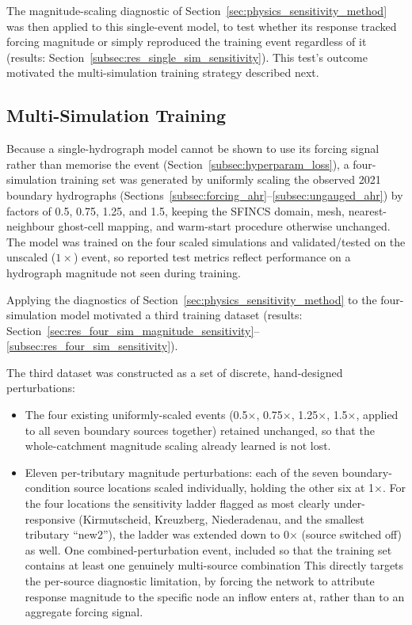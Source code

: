 \documentclass[12pt,a4paper]{report}
\begin{document}
{The magnitude-scaling diagnostic of Section~\ref{sec:physics_sensitivity_method}
was then applied to this single-event model, to test whether its response tracked
forcing magnitude or simply reproduced the training event regardless of it
(results: Section~\ref{subsec:res_single_sim_sensitivity}). This test's outcome
motivated the multi-simulation training strategy described next.

\subsection{Multi-Simulation Training}
\label{subsec:multisimtraining}

Because a single-hydrograph model cannot be shown to use its forcing signal rather than
memorise the event (Section~\ref{subsec:hyperparam_loss}), a four-simulation training
set was generated by uniformly scaling the observed 2021 boundary hydrographs
(Sections~\ref{subsec:forcing_ahr}--\ref{subsec:ungauged_ahr}) by factors of 0.5, 0.75,
1.25, and 1.5, keeping the SFINCS domain, mesh, nearest-neighbour ghost-cell mapping,
and warm-start procedure otherwise unchanged. The model was trained on the four scaled
simulations and validated/tested on the unscaled ($1\times$) event, so reported test
metrics reflect performance on a hydrograph magnitude not seen during training.

Applying the diagnostics of Section~\ref{sec:physics_sensitivity_method} to the four-simulation model motivated a third training dataset (results: Section~\ref{sec:res_four_sim_magnitude_sensitivity}--\ref{subsec:res_four_sim_sensitivity}).

The third dataset was constructed as a set of discrete, hand-designed perturbations:

\begin{itemize}
    \item The four existing uniformly-scaled events (0.5$\times$, 0.75$\times$, 1.25$\times$, 1.5$\times$, applied to all seven boundary sources together) retained unchanged, so that the whole-catchment magnitude scaling already learned is not lost.
    \item Eleven per-tributary magnitude perturbations: each of the seven boundary-condition source locations scaled individually, holding the other six at 1$\times$. For the four locations the sensitivity ladder flagged as most clearly under-responsive (Kirmutscheid, Kreuzberg, Niederadenau, and the smallest tributary ``new2''), the ladder was extended down to 0$\times$ (source switched off) as well.
    One combined-perturbation event, included so that the training set contains at least one genuinely multi-source combination
    This directly targets the per-source diagnostic limitation, by forcing the network to attribute response magnitude to the specific node an inflow enters at, rather than to an aggregate forcing signal.
    

\end{itemize}}
\end{document}
